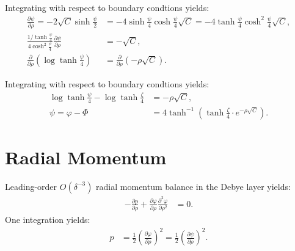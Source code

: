 \documentclass[MSc,beforeExam]{iitcsthesis}
\newcommand{\deriv}[2]{\frac{\partial #1}{\partial #2}}
\newcommand{\pars}[1]{\left(#1\right)}
\begin{document}
Integrating with respect to boundary condtions yields:
\begin{align}  
\nonumber
\deriv{\psi}{\rho} = -2\sqrt{C}\sinh\frac{\psi}{2} &= 
-4\sinh\frac{\psi}{4}\cosh\frac{\psi}{4} \sqrt{C} = 
-4\tanh\frac{\psi}{4}\cosh^2\frac{\psi}{4} \sqrt{C}, \\  
\frac{1/{\tanh\frac{\psi}{4}}}{4\cosh^2\frac{\psi}{4}}
\deriv{\psi}{\rho}
&= -\sqrt{C}, \\  
\nonumber
\deriv{}{\rho}\pars{\log\tanh\frac{\psi}{4}} &= \deriv{}{\rho}\pars{-\rho \sqrt{C}} .
\end{align}

Integrating with respect to boundary condtions yields:
\begin{align}
\nonumber
\log\tanh\frac{\psi}{4} - \log\tanh\frac{\zeta}{4} &= -\rho \sqrt{C}, \\
\psi = \varphi - \varPhi &= 
4 \tanh^{-1}\pars{\tanh{\frac{\zeta}{4}} \cdot e^{-\rho \sqrt{C}}}.
\end{align}

\section{Radial Momentum}
Leading-order $O(\delta^{-3})$ radial momentum balance in the Debye layer yields:
\begin{align} 
- \deriv{p}{\rho} + \deriv{\varphi}{\rho} \deriv{^2\varphi}{\rho^2} &= 0.
\end{align}
One integration yields:
\begin{align} 
p &= \frac{1}{2}\pars{\deriv{\varphi}{\rho}}^2 = \frac{1}{2}\pars{\deriv{\psi}{\rho}}^2.
\end{align}
\end{document}
